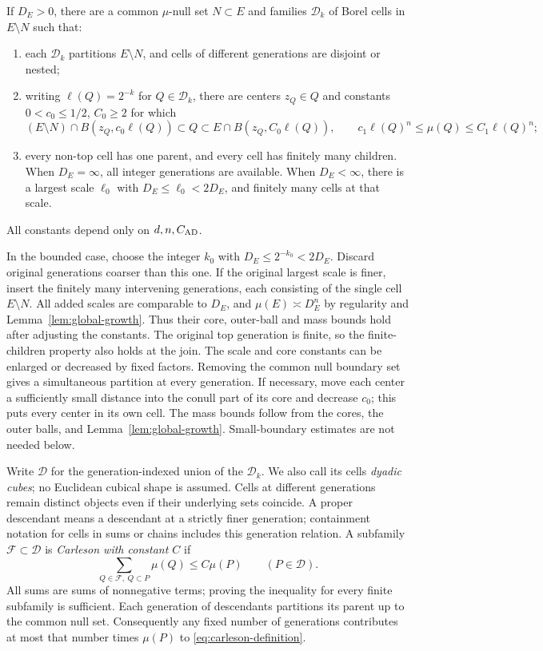 \begin{proposition}\label{prop:dyadic-lattice}
If $D_E>0$, there are a common $\mu$-null set $N\subset E$ and
families $\mathcal D_k$ of Borel cells in $E\setminus N$ such that:
\begin{enumerate}[label=(\roman*)]
\item each $\mathcal D_k$ partitions $E\setminus N$, and cells of
different generations are disjoint or nested;
\item writing $\ell(Q)=2^{-k}$ for $Q\in\mathcal D_k$, there are
centers $z_Q\in Q$ and constants $0<c_0\le1/2$, $C_0\ge2$ for which
\[
 (E\setminus N)\cap B(z_Q,c_0\ell(Q))\subset Q
 \subset E\cap B(z_Q,C_0\ell(Q)),\qquad
 c_1\ell(Q)^n\le\mu(Q)\le C_1\ell(Q)^n;
\]
\item every non-top cell has one parent, and every cell has finitely
many children. When
$D_E=\infty$, all integer generations are available. When
$D_E<\infty$, there is a largest scale $\ell_0$ with
$D_E\le\ell_0<2D_E$, and finitely many cells at that scale.
\end{enumerate}
All constants depend only on $d,n,C_{\rm AD}$.
\end{proposition}

In the bounded case, choose the integer $k_0$ with
$D_E\le2^{-k_0}<2D_E$. Discard original generations coarser than this
one. If the original largest scale is finer, insert the finitely many
intervening generations, each consisting of the single cell
$E\setminus N$. All added scales are comparable to $D_E$, and
$\mu(E)\asymp D_E^n$ by regularity and Lemma~\ref{lem:global-growth}.
Thus their core, outer-ball and mass bounds hold after adjusting the
constants. The original top generation is finite, so the finite-children
property also holds at the join. The scale and core constants can be
enlarged or decreased by fixed factors.
Removing the common null boundary set gives a simultaneous partition
at every generation. If necessary, move each center a sufficiently
small distance into the conull part of its core and decrease $c_0$;
this puts every center in its own cell. The mass bounds follow from
the cores, the outer balls, and Lemma~\ref{lem:global-growth}.
Small-boundary estimates are not needed below.

Write $\mathcal D$ for the generation-indexed union of the
$\mathcal D_k$. We also call its cells \emph{dyadic cubes}; no Euclidean
cubical shape is assumed. Cells at different generations remain distinct objects
even if their underlying sets coincide. A proper descendant means a
descendant at a strictly finer generation; containment notation for
cells in sums or chains includes this generation relation. A subfamily
$\mathcal F\subset\mathcal D$ is \emph{Carleson with constant $C$}
if
\begin{equation}\label{eq:carleson-definition}
 \sum_{Q\in\mathcal F,\ Q\subset P}\mu(Q)\le C\mu(P)
 \qquad(P\in\mathcal D).
\end{equation}
All sums are sums of nonnegative terms; proving the inequality for
every finite subfamily is sufficient. Each generation of descendants
partitions its parent up to the common null set. Consequently any
fixed number of generations contributes at most that number times
$\mu(P)$ to \eqref{eq:carleson-definition}.


